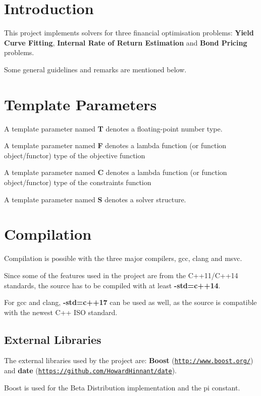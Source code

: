 \hypertarget{index_intro_sec}{}\section{Introduction}\label{index_intro_sec}
This project implements solvers for three financial optimisation problems\+: {\bfseries Yield Curve Fitting}, {\bfseries Internal Rate of Return Estimation} and {\bfseries Bond Pricing} problems.

Some general guidelines and remarks are mentioned below.\hypertarget{index_template_guide}{}\section{Template Parameters}\label{index_template_guide}
A template parameter named {\bfseries T} denotes a floating-\/point number type.

A template parameter named {\bfseries F} denotes a lambda function (or function object/functor) type of the objective function

A template parameter named {\bfseries C} denotes a lambda function (or function object/functor) type of the constraints function

A template parameter named {\bfseries S} denotes a solver structure.\hypertarget{index_compile_guide}{}\section{Compilation}\label{index_compile_guide}
Compilation is possible with the three major compilers, gcc, clang and msvc.

Since some of the features used in the project are from the C++11/\+C++14 standards, the source has to be compiled with at least {\bfseries -\/std=c++14}.

For gcc and clang, {\bfseries -\/std=c++17} can be used as well, as the source is compatible with the newest C++ I\+SO standard.\hypertarget{index_external_libraries}{}\subsection{External Libraries}\label{index_external_libraries}
The external libraries used by the project are\+: {\bfseries Boost} (\href{http://www.boost.org/}{\tt http\+://www.\+boost.\+org/}) and {\bfseries date} (\href{https://github.com/HowardHinnant/date}{\tt https\+://github.\+com/\+Howard\+Hinnant/date}).

Boost is used for the Beta Distribution implementation and the pi constant.

